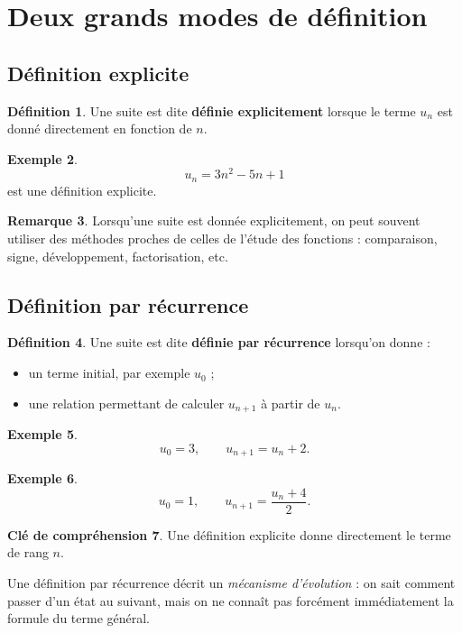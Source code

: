 \documentclass[11pt,a4paper]{article}
\theoremstyle{definition}
\newtheorem{definition}{Définition}[section]
\newtheorem{exemple}[definition]{Exemple}
\newtheorem{remarque}[definition]{Remarque}
\newtheorem{interpretation}[definition]{Clé de compréhension}
\theoremstyle{plain}
\theoremstyle{remark}
\begin{document}
\section{Deux grands modes de définition}

\subsection{Définition explicite}

\begin{definition}
Une suite est dite \textbf{définie explicitement} lorsque le terme $u_n$ est donné directement en fonction de $n$.
\end{definition}

\begin{exemple}
\[
u_n=3n^2-5n+1
\]
est une définition explicite.
\end{exemple}

\begin{remarque}
Lorsqu'une suite est donnée explicitement, on peut souvent utiliser des méthodes proches de celles de l'étude des fonctions : comparaison, signe, développement, factorisation, etc.
\end{remarque}

\subsection{Définition par récurrence}

\begin{definition}
Une suite est dite \textbf{définie par récurrence} lorsqu'on donne :
\begin{itemize}[leftmargin=0.8cm]
    \item un terme initial, par exemple $u_0$ ;
    \item une relation permettant de calculer $u_{n+1}$ à partir de $u_n$.
\end{itemize}
\end{definition}

\begin{exemple}
\[
u_0=3,\qquad u_{n+1}=u_n+2.
\]
\end{exemple}

\begin{exemple}
\[
u_0=1,\qquad u_{n+1}=\frac{u_n+4}{2}.
\]
\end{exemple}

\begin{interpretation}
Une définition explicite donne directement le terme de rang $n$.

Une définition par récurrence décrit un \emph{mécanisme d'évolution} : on sait comment passer d'un état au suivant, mais on ne connaît pas forcément immédiatement la formule du terme général.
\end{interpretation}
\end{document}
